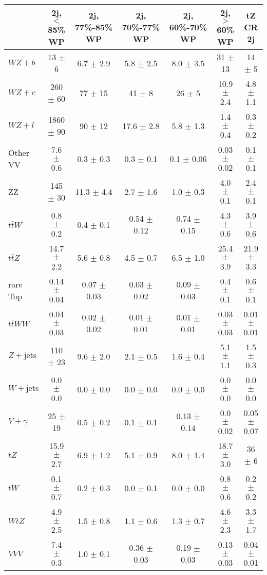 \begin{tabular}{|l|c|c|c|c|c|c|}
\hline 
 & {2j, $<$85\% WP} & {2j, 77\%-85\% WP} & {2j, 70\%-77\% WP} & {2j, 60\%-70\% WP} & {2j, $>$60\% WP} & {tZ CR 2j}\\
\hline 
  $WZ + b$   & 13 $\pm$ 6 & 6.7 $\pm$ 2.9 & 5.8 $\pm$ 2.5 & 8.0 $\pm$ 3.5 & 31 $\pm$ 13 & 14 $\pm$ 5 \\ 
  $WZ + c$   & 260 $\pm$ 60 & 77 $\pm$ 15 & 41 $\pm$ 8 & 26 $\pm$ 5 & 10.9 $\pm$ 2.4 & 4.8 $\pm$ 1.1 \\ 
  $WZ + l$   & 1860 $\pm$ 90 & 90 $\pm$ 12 & 17.6 $\pm$ 2.8 & 5.8 $\pm$ 1.3 & 1.4 $\pm$ 0.4 & 0.3 $\pm$ 0.2 \\ 
  Other VV   & 7.6 $\pm$ 0.6 & 0.3 $\pm$ 0.3 & 0.3 $\pm$ 0.1 & 0.1 $\pm$ 0.06 & 0.03 $\pm$ 0.02 & 0.1 $\pm$ 0.1 \\ 
  ZZ  & 145 $\pm$ 30 & 11.3 $\pm$ 4.4 & 2.7 $\pm$ 1.6 & 1.0 $\pm$ 0.3 & 4.0 $\pm$ 0.1 & 2.4 $\pm$ 0.1 \\ 
  $t\bar{t}W$   & 0.8 $\pm$ 0.2 & 0.4 $\pm$ 0.1 & 0.54 $\pm$ 0.12 & 0.74 $\pm$ 0.15 & 4.3 $\pm$ 0.6 & 3.9 $\pm$ 0.6 \\ 
  $t\bar{t}Z$   & 14.7 $\pm$ 2.2 & 5.6 $\pm$ 0.8 & 4.5 $\pm$ 0.7 & 6.5 $\pm$ 1.0 & 25.4 $\pm$ 3.9 & 21.9 $\pm$ 3.3 \\ 
  rare Top   & 0.14 $\pm$ 0.04 & 0.07 $\pm$ 0.03 & 0.03 $\pm$ 0.02 & 0.09 $\pm$ 0.03 & 0.4 $\pm$ 0.1 & 0.6 $\pm$ 0.1 \\ 
  $t\bar{t}WW$   & 0.04 $\pm$ 0.03 & 0.02 $\pm$ 0.02 & 0.01 $\pm$ 0.01 & 0.01 $\pm$ 0.01 & 0.03 $\pm$ 0.03 & 0.01 $\pm$ 0.01 \\ 
  $Z+\text{jets}$   & 110 $\pm$ 23 & 9.6 $\pm$ 2.0 & 2.1 $\pm$ 0.5 & 1.6 $\pm$ 0.4 & 5.1 $\pm$ 1.1 & 1.5 $\pm$ 0.3 \\ 
  $W+\text{jets}$   & 0.0 $\pm$ 0.0 & 0.0 $\pm$ 0.0 & 0.0 $\pm$ 0.0 & 0.0 $\pm$ 0.0 & 0.0 $\pm$ 0.0 & 0.0 $\pm$ 0.0 \\ 
  $V+\gamma$   & 25 $\pm$ 19 & 0.5 $\pm$ 0.2 & 0.1 $\pm$ 0.1 & 0.13 $\pm$ 0.14 & 0.0 $\pm$ 0.02 & 0.05 $\pm$ 0.07 \\ 
  $tZ$   & 15.9 $\pm$ 2.7 & 6.9 $\pm$ 1.2 & 5.1 $\pm$ 0.9 & 8.0 $\pm$ 1.4 & 18.7 $\pm$ 3.0 & 36 $\pm$ 6 \\ 
  $tW$   & 0.1 $\pm$ 0.7 & 0.2 $\pm$ 0.3 & 0.0 $\pm$ 0.1 & 0.0 $\pm$ 0.0 & 0.8 $\pm$ 0.6 & 0.2 $\pm$ 0.2 \\ 
  $WtZ$   & 4.9 $\pm$ 2.5 & 1.5 $\pm$ 0.8 & 1.1 $\pm$ 0.6 & 1.3 $\pm$ 0.7 & 4.6 $\pm$ 2.3 & 3.3 $\pm$ 1.7 \\ 
  $VVV$   & 7.4 $\pm$ 0.3 & 1.0 $\pm$ 0.1 & 0.36 $\pm$ 0.03 & 0.19 $\pm$ 0.03 & 0.13 $\pm$ 0.03 & 0.04 $\pm$ 0.01 \\ 

\end{tabular}
